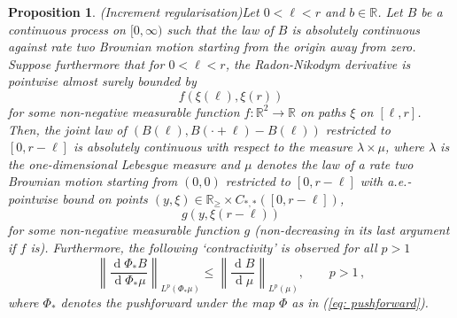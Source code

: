 \documentclass[11pt, reqno]{amsart}
\numberwithin{equation}{section}
\newcounter{dummy} \numberwithin{dummy}{section}
\newtheorem{proposition}[dummy]{Proposition}
\newcommand{\R}{\ensuremath{\mathbb{R}}}
\newcommand{\norm}[1]{\left\lVert#1\right\rVert}
\newcommand{\diff}{\ensuremath{\operatorname{d}\!}}
\begin{document}
\begin{proposition}(Increment regularisation)\label{prop: 3} Let $0<\ell<r$ and $b\in \R$. Let $B$ be a continuous process on $[0,\infty)$ such that the law of $B$ is absolutely continuous against rate two Brownian motion starting from the origin away from zero. Suppose furthermore that for $0<\ell<r$, the Radon-Nikodym derivative is pointwise almost surely bounded by
$$
f(\xi(\ell), \xi(r))
$$
for some non-negative measurable function $f:\R^2 \to \R$ on paths $\xi$ on $[\ell, r]$. Then, the joint law of $(B(\ell), B(\cdot + \ell)-B(\ell))$ restricted to $[0,r-\ell]$ is absolutely continuous with respect to the measure $\lambda\times \mu$, where $\lambda$ is the one-dimensional Lebesgue measure and $\mu$ denotes the law of a rate two Brownian motion starting from $(0,0)$ restricted to $[0,r-\ell]$ with a.e.-pointwise bound on points $(y, \xi)\in \R_\ge\times C_{*,*}([0,r-\ell])$,
$$
g(y,\xi(r-\ell))
$$
for some non-negative measurable function $g$ (non-decreasing in its last argument if $f$ is). Furthermore, the following `contractivity' is observed for all $p>1$
\[
\norm{\frac{\diff \Phi_* B}{\diff \Phi_*\mu}}_{L^p(\Phi_*\mu)}\le \norm{\frac{\diff  B}{\diff \mu}}_{L^p(\mu)},\qquad p>1\,,
\]
where $\Phi_*$ denotes the pushforward under the map $\Phi$ as in (\ref{eq: pushforward}).
\end{proposition}
\end{document}
